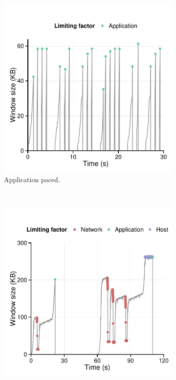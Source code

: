 \begin{figure}[!ht]
\centering
  \centering
  \begin{subfigure}[b]{1.0\linewidth}
    \includegraphics[width=1.0\textwidth]{figures/malawi/youtube.pdf}
    \caption{Application paced. \label{fig:youtube}}
  \end{subfigure}\\
  \begin{subfigure}[b]{1.0\linewidth}
    \includegraphics[width=1.0\textwidth]{figures/malawi/hostflow.pdf}

\end{subfigure}
\end{figure}
